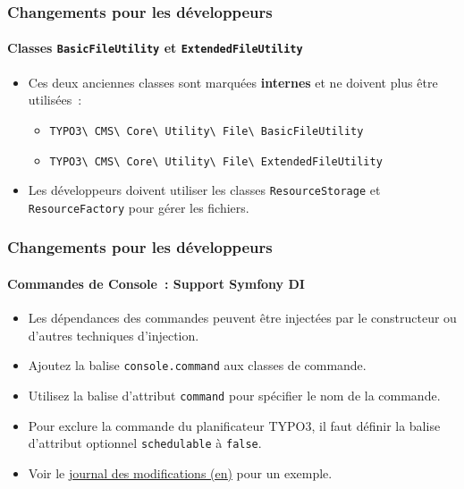 \begin{frame}[fragile]
	\frametitle{Changements pour les développeurs}
	\framesubtitle{Classes \texttt{BasicFileUtility} et \texttt{ExtendedFileUtility}}

	\begin{itemize}
		\item Ces deux anciennes classes sont marquées \textbf{internes}
			et ne doivent plus être utilisées~:

			\begin{itemize}\small
				\item \texttt{TYPO3\textbackslash
					CMS\textbackslash
					Core\textbackslash
					Utility\textbackslash
					File\textbackslash
					BasicFileUtility}
				\item \texttt{TYPO3\textbackslash
					CMS\textbackslash
					Core\textbackslash
					Utility\textbackslash
					File\textbackslash
					ExtendedFileUtility}
			\end{itemize}

		\item Les développeurs doivent utiliser les classes \texttt{ResourceStorage}
			et \texttt{ResourceFactory} pour gérer les fichiers.

	\end{itemize}

\end{frame}


\begin{frame}[fragile]
	\frametitle{Changements pour les développeurs}
	\framesubtitle{Commandes de Console~: Support Symfony DI}

	\begin{itemize}
		\item Les dépendances des commandes peuvent être injectées par le constructeur ou d'autres
			techniques d'injection.
		\item Ajoutez la balise \texttt{console.command} aux classes de commande.
		\item Utilisez la balise d'attribut \texttt{command} pour spécifier le nom de la commande.
		\item Pour exclure la commande du planificateur TYPO3, il faut définir la balise d'attribut
			optionnel \texttt{schedulable} à \texttt{false}.

		\item Voir le
			\href{https://docs.typo3.org/c/typo3/cms-core/master/en-us/Changelog/10.3/Feature-89139-AddDependencyInjectionSupportForConsoleCommands.html}{journal des modifications (en)}
			pour un exemple.
	\end{itemize}

\end{frame}

